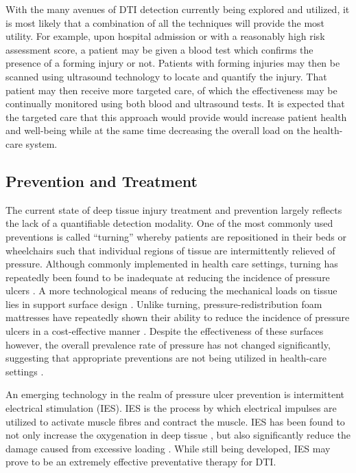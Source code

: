 			With the many avenues of DTI detection currently being explored and utilized, it is most likely that a combination of all the techniques will provide the most utility. For example, upon hospital admission or with a reasonably high risk assessment score, a patient may be given a blood test which confirms the presence of a forming injury or not. Patients with forming injuries may then be scanned using ultrasound technology to locate and quantify the injury. That patient may then receive more targeted care, of which the effectiveness may be continually monitored using both blood and ultrasound tests. It is expected that the targeted care that this approach would provide would increase patient health and well-being while at the same time decreasing the overall load on the health-care system.

		\subsection{Prevention and Treatment}
			The current state of deep tissue injury treatment and prevention largely reflects the lack of a quantifiable detection modality. One of the most commonly used preventions is called ``turning'' whereby patients are repositioned in their beds or wheelchairs such that individual regions of tissue are intermittently relieved of pressure. Although commonly implemented in health care settings, turning has repeatedly been found to be inadequate at reducing the incidence of pressure ulcers \cite{vanderwee07,rich11}. A more technological means of reducing the mechanical loads on tissue lies in support surface design \cite{krouskop86}. Unlike turning, pressure-redistribution foam mattresses have repeatedly shown their ability to reduce the incidence of pressure ulcers in a cost-effective manner \cite{pham11,rafter11}. Despite the effectiveness of these surfaces however, the overall prevalence rate of pressure has not changed significantly, suggesting that appropriate preventions are not being utilized in health-care settings \cite{maklebust05}.

			An emerging technology in the realm of pressure ulcer prevention is intermittent electrical stimulation (IES). IES is the process by which electrical impulses are utilized to activate muscle fibres and contract the muscle. IES has been found to not only increase the oxygenation in deep tissue \cite{gyawali11}, but also significantly reduce the damage caused from excessive loading \cite{solis13}. While still being developed, IES may prove to be an extremely effective preventative therapy for DTI.

